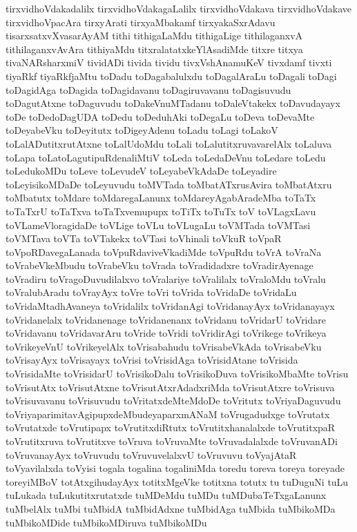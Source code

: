 {tirxvidhoVdakadalilx
tirxvidhoVdakagaLalilx
tirxvidhoVdakava
tirxvidhoVdakave
tirxvidhoVpacAra
tirxyArati
tirxyaMbakamf
tirxyakaSxrAdavu
tisarxsatxvXvasarAyAM
tithi
tithigaLaMdu
tithigaLige
tithilaganxvA
tithilaganxvAvAra
tithiyaMdu
titxralatatxkeYlAsadiMde
titxre
titxya
tivaNARsharxmiV
tividADi
tivida
tividu
tivxVshAnamuKeV
tivxdamf
tivxti
tiyaRkf
tiyaRkfjaMtu
toDadu
toDagabalulxdu
toDagalAraLu
toDagali
toDagi
toDagidAga
toDagida
toDagidavanu
toDagiruvavanu
toDagisuvudu
toDagutAtxne
toDaguvudu
toDakeVnuMTadanu
toDaleVtakekx
toDavudayayx
toDe
toDedoDagUDA
toDedu
toDeduhAki
toDegaLu
toDeva
toDevaMte
toDeyabeVku
toDeyitutx
toDigeyAdenu
toLadu
toLagi
toLakoV
toLalADutitxrutAtxne
toLalUdoMdu
toLali
toLalutitxruvavarelAlx
toLaluva
toLapa
toLatoLagutipuRdenaliMtiV
toLeda
toLedaDeVnu
toLedare
toLedu
toLedukoMDu
toLeve
toLevudeV
toLeyabeVkAdaDe
toLeyadire
toLeyisikoMDaDe
toLeyuvudu
toMVTada
toMbatATxrusAvira
toMbatAtxru
toMbatutx
toMdare
toMdaregaLanunx
toMdareyAgabAradeMba
toTaTx
toTaTxrU
toTaTxva
toTaTxvemupupx
toTiTx
toTuTx
toV
toVLagxLavu
toVLameVloragidaDe
toVLige
toVLu
toVLugaLu
toVMTada
toVMTasi
toVMTava
toVTa
toVTakekx
toVTasi
toVhinali
toVkuR
toVpaR
toVpoRDavegaLanada
toVpuRdaviveVkadiMde
toVpuRdu
toVrA
toVraNa
toVrabeVkeMbudu
toVrabeVku
toVrada
toVradidadxre
toVradirAyenage
toVradiru
toVragoDuvudilalxvo
toVralariye
toVralilalx
toVraloMdu
toVralu
toVralubAradu
toVrayAyx
toVre
toVri
toVrida
toVridaDe
toVridaLu
toVridaMtadhAvaneya
toVridalilx
toVridanAgi
toVridanayAyx
toVridanayayx
toVridanelalx
toVridanenage
toVridanenanx
toVridanu
toVridarU
toVridare
toVridavanu
toVridavarAru
toVride
toVridi
toVridirAgi
toVrikege
toVrikeya
toVrikeyeVnU
toVrikeyelAlx
toVrisabahudu
toVrisabeVkAda
toVrisabeVku
toVrisayAyx
toVrisayayx
toVrisi
toVrisidAga
toVrisidAtane
toVrisida
toVrisidaMte
toVrisidarU
toVrisikoDalu
toVrisikoDuva
toVrisikoMbaMte
toVrisu
toVrisutAtx
toVrisutAtxne
toVrisutAtxrAdadxriMda
toVrisutAtxre
toVrisuva
toVrisuvavanu
toVrisuvudu
toVritatxdeMteMdoDe
toVritutx
toVriyaDaguvudu
toVriyaparimitavAgipupxdeMbudeyaparxmANaM
toVrugadudxge
toVrutatx
toVrutatxde
toVrutipapx
toVrutitxdiRtutx
toVrutitxhanalalxde
toVrutitxpaR
toVrutitxruva
toVrutitxve
toVruva
toVruvaMte
toVruvadalalxde
toVruvanADi
toVruvanayAyx
toVruvudu
toVruvuvelalxvU
toVruvuvu
toVyajAtaR
toVyavilalxda
toVyisi
togala
togalina
togaliniMda
toredu
toreva
toreya
toreyade
toreyiMBoV
totAtxgihudayAyx
totitxMgeVke
totitxna
totutx
tu
tuDuguNi
tuLu
tuLukada
tuLukutitxrutatxde
tuMDeMdu
tuMDu
tuMDubaTeTxgaLanunx
tuMbelAlx
tuMbi
tuMbidA
tuMbidAdxne
tuMbidAga
tuMbida
tuMbikoMDa
tuMbikoMDide
tuMbikoMDiruva
tuMbikoMDu
}
